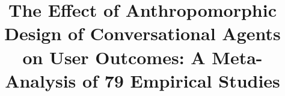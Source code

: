 \documentclass[preprint,review,12pt,authoryear,nonatbib]{elsarticle}
\begin{document}
\begin{frontmatter}

\title{The Effect of Anthropomorphic Design of Conversational Agents on User Outcomes: A Meta-Analysis of 79 Empirical Studies}






\end{frontmatter}
\end{document}
